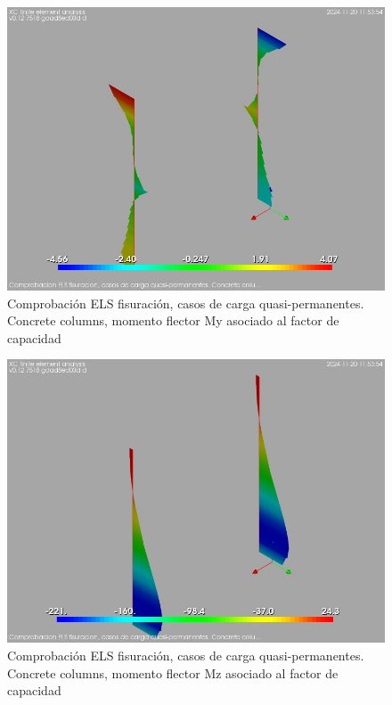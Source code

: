 \begin{figure}[ht]
\begin{center}
\includegraphics[width=\linewidth]{results/graphics/crackingSLS_qperm/columnZconcrMy}
\caption{Comprobación ELS fisuración, casos de carga quasi-permanentes. Concrete columns, momento flector My asociado al factor de capacidad}
\label{SLS_quasiPermanentLoadsCrackControlcolumnZconcrMy}
\end{center}
\end{figure}
\begin{figure}[ht]
\begin{center}
\includegraphics[width=\linewidth]{results/graphics/crackingSLS_qperm/columnZconcrMz}
\caption{Comprobación ELS fisuración, casos de carga quasi-permanentes. Concrete columns, momento flector Mz asociado al factor de capacidad}
\label{SLS_quasiPermanentLoadsCrackControlcolumnZconcrMz}
\end{center}
\end{figure}
